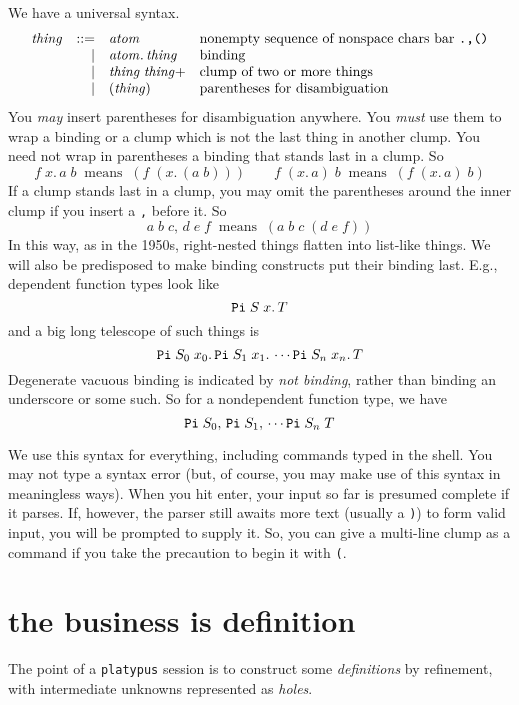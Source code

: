 \documentclass{article}
\begin{document}
We have a universal syntax.
\[\begin{array}{rrll}
\mathit{thing} & ::= & \mathit{atom}
  & \mbox{nonempty sequence of nonspace chars bar {\tt .,()}}\\
               &   | & \mathit{atom}.\,\mathit{thing}
  & \mbox{binding}\\
               &   | & \mathit{thing}\;\mathit{thing}+
  & \mbox{clump of two or more things} \\
               &   | & {\tt (}\mathit{thing}{\tt )}
  & \mbox{parentheses for disambiguation} \\
\end{array}\]
You \emph{may} insert parentheses for disambiguation anywhere. You
\emph{must} use them to wrap a binding or a clump which is not the
last thing in another clump. You need not wrap in parentheses a
binding that stands last in a clump. So
\[
  f\;x.\,a\; b\;\;\mbox{means}\;\;(f\;(x.\,(a\; b))) \qquad
  f\;(x.\,a)\; b\;\;\mbox{means}\;\;(f\;(x.\,a)\; b)
\]
If a clump stands last in a clump, you may omit the parentheses
around the inner clump if you insert a {\tt ,} before it. So
\[
 a\;b\;c,\,d\;e\;f\;\;\mbox{means}\;\;(a\;b\;c\;(d\;e\;f))
\]
In this way, as in the 1950s, right-nested things flatten into
list-like things. We will also be predisposed to make binding
constructs put their binding last. E.g., dependent function types
look like
\[
  {\tt Pi}\;S\;x.\,T
\]
and a big long telescope of such things is
\[
  {\tt Pi}\;S_0\;x_0.\,{\tt Pi}\;S_1\;x_1.\,\cdots {\tt Pi}\;S_n\;x_n.\, T
\]
Degenerate vacuous binding is indicated by \emph{not binding}, rather
than binding an underscore or some such. So for a nondependent
function
type, we have
\[
  {\tt Pi}\;S_0,\,{\tt Pi}\;S_1,\,\cdots {\tt Pi}\;S_n\; T
\]

We use this syntax for everything, including commands typed in the
shell. You may not type a syntax error (but, of course, you may make
use of this syntax in meaningless ways). When you hit enter, your
input so far is presumed complete if it parses. If, however, the
parser still awaits more text (usually a {\tt )}) to form valid input,
you will be prompted to supply it. So, you can give a multi-line
clump as a command if you take the precaution to begin it with {\tt (}.


\section{the business is definition}

The point of a {\tt platypus} session is to construct some \emph{definitions} by refinement,
with intermediate unknowns represented as \emph{holes}.
\end{document}
